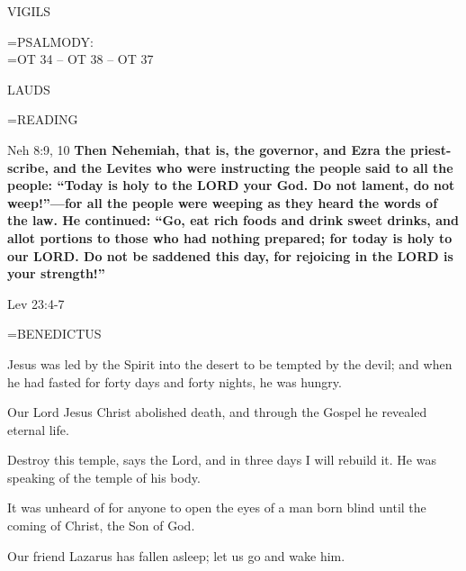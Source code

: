 \begin{flushleft}\normalsize VIGILS\\\end{flushleft}

\hangindent=\parindent \small{PSALMODY:}\\
\hangindent=\parindent  OT 34 -- OT 38 -- OT 37\vspace{0.5em}

\begin{flushleft}\normalsize LAUDS\\\end{flushleft}

\hangindent=\parindent \small READING
\begin{description}[labelindent=\parindent, leftmargin=*]
\item [Weeks 1-4:]     Neh 8:9, 10 \textbf{    Then Nehemiah, that is, the governor, and Ezra the priest-scribe, and the Levites who were instructing the people said to all the people: “Today is holy to the LORD your God. Do not lament, do not weep!”—for all the people were weeping as they heard the words of the law. He continued: “Go, eat rich foods and drink sweet drinks, and allot portions to those who had nothing prepared; for today is holy to our LORD. Do not be saddened this day, for rejoicing in the LORD is your strength!” }
\item [Week 5:]   Lev 23:4-7 \textbf{  }
\end{description}

\hangindent=\parindent \small BENEDICTUS
\begin{description}[labelindent=\parindent, noitemsep, leftmargin=*]
\item [Week 1:] 	Jesus was led by the Spirit into the desert to be tempted by the devil; and when he had fasted for forty days and forty nights, he was hungry.
\item [Week 2:] 	Our Lord Jesus Christ abolished death, and through the Gospel he revealed eternal life.
\item [Week 3:] 	Destroy this temple, says the Lord, and in three days I will rebuild it. He was speaking of the temple of his body.
\item [Week 4:] 	It was unheard of for anyone to open the eyes of a man born blind until the coming of Christ, the Son of God.
\item [Week 5:] 	Our friend Lazarus has fallen asleep; let us go and wake him.
\end{description}

